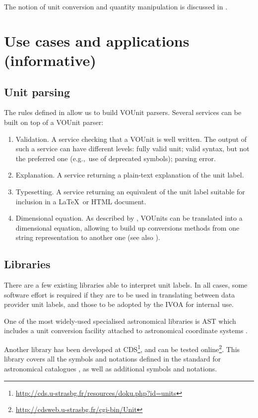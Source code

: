 \documentclass[11pt,notitlepage,onecolumn]{ivoa}
\def\eg{e.g.,~}
\begin{document}
The notion of unit conversion and quantity manipulation is discussed in
.

\section{Use cases and applications (informative)\label{sec:useCase}}

\subsection{Unit parsing}

The rules defined in  allow us to build VOUnit parsers.
Several services can be built on top of a VOUnit parser:

\begin{enumerate}
\item Validation. A service checking that a VOUnit is well written. The output
of such a service can have different levels: fully valid unit; valid syntax, but
not the preferred one (\eg  use of deprecated symbols); parsing error. 
\item Explanation. A service returning a plain-text explanation of the unit label.
\item Typesetting. A service returning an equivalent of the unit label suitable for inclusion in
a \LaTeX\ or HTML document.
\item Dimensional equation. As described by \citet{osuna05}, VOUnits can be translated
into a dimensional equation, allowing to build up conversions methods from one string 
representation to another one (see also ). 
\end{enumerate}

\subsection{Libraries\label{sec:libraries}}

There are a few existing libraries able to interpret unit labels.
In all cases,
some software effort is required if they are to be used in translating
between data provider unit labels, and those to be adopted by
the IVOA for internal use.

One of the most widely-used specialised
astronomical libraries is AST which includes a unit conversion
facility attached to astronomical coordinate systems \citep{berry12}.

Another library has been developed at
CDS\footnote{\url{http://cds.u-strasbg.fr/resources/doku.php?id=units}},
and can be tested online\footnote{\url{http://cdsweb.u-strasbg.fr/cgi-bin/Unit}}. This library covers all
the symbols and notations defined in the standard for astronomical catalogues \citep[\S3.2]{cds00}, as well as
additional symbols and notations.
\end{document}
